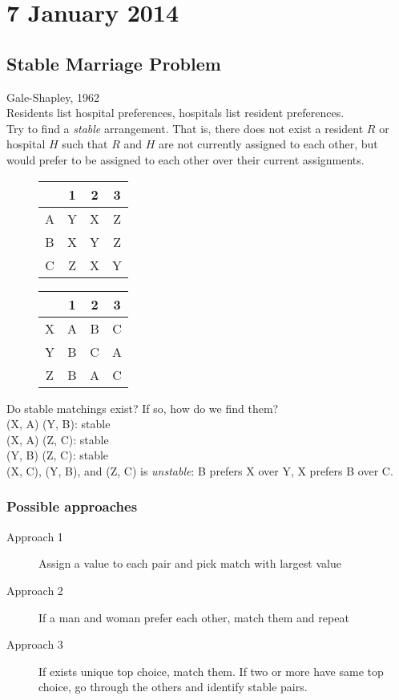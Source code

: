 \section{7 January 2014}
\subsection{Stable Marriage Problem}
Gale-Shapley, 1962\\

Residents list hospital preferences, hospitals list resident preferences.\\

Try to find a \emph{stable} arrangement. That is, there does not exist a resident $R$ or hospital $H$ such that $R$ and $H$ are not currently assigned to each other, but would prefer to be assigned to each other over their current assignments.

\begin{figure}[h]
\begin{minipage}[h]{.5\linewidth}
\centering
\begin{tabular}{c|c c c}
  & 1 & 2 & 3 \\ \hline
A & Y & X & Z \\
B & X & Y & Z \\
C & Z & X & Y
\end{tabular}
\end{minipage}
\begin{minipage}[h]{.5\linewidth}
\centering
\begin{tabular}{c|c c c}
  & 1 & 2 & 3 \\ \hline
X & A & B & C \\
Y & B & C & A \\
Z & B & A & C
\end{tabular}
\end{minipage}
\end{figure}

Do stable matchings exist? If so, how do we find them?\\

(X, A) (Y, B): stable\\
(X, A) (Z, C): stable\\
(Y, B) (Z, C): stable\\

(X, C), (Y, B), and (Z, C) is \emph{unstable}: B prefers X over Y, X prefers B over C.

\subsubsection*{Possible approaches}
\begin{description}
\item[Approach 1] Assign a value to each pair and pick match with largest value
\item[Approach 2] If a man and woman prefer each other, match them and repeat
\item[Approach 3] If exists unique top choice, match them. If two or more have same top choice, go through the others and identify stable pairs.
\end{description}


